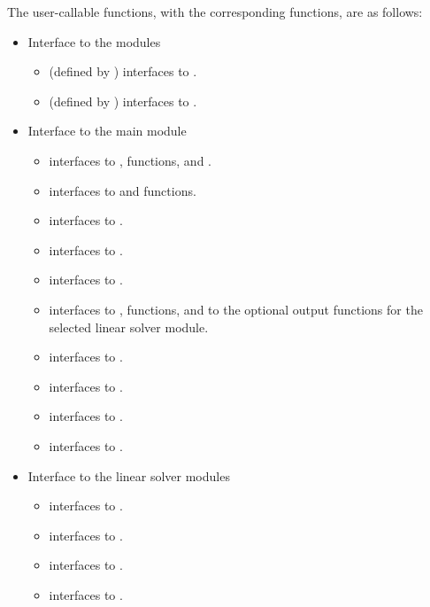 The user-callable functions, with the corresponding {\ida} functions,
are as follows:
\begin{itemize}
\item
  Interface to the {\nvector} modules
  \begin{itemize}
  \item {} (defined by {\nvecs}) 
    interfaces to .
  \item {} (defined by {\nvecp}) 
    interfaces to .
  \end{itemize}
\item Interface to the main {\ida} module
  \begin{itemize}
  \item {}
    interfaces to ,  functions, and .
  \item {}
    interfaces to  and  functions.
  \item {}
    interfaces to .
  \item {}
    interfaces to .
  \item {}
    interfaces to .
  \item {}
    interfaces to ,  functions, and to the optional
    output functions for the selected linear solver module.
  \item {}
    interfaces to .
  \item {}
    interfaces to .
  \item {}
    interfaces to .
  \item {}    
    interfaces to .
  \end{itemize}
\item Interface to the linear solver modules
  \begin{itemize}
  \item {}
    interfaces to .
  \item {}
    interfaces to .
  \item {}
    interfaces to .
  \item {}
    interfaces to .

\end{itemize}
\end{itemize}
